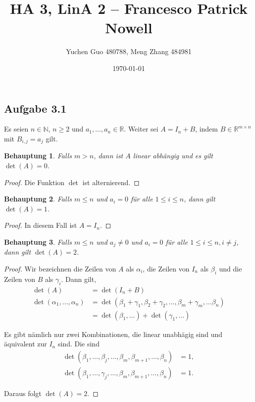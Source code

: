 \documentclass[draft,a5paper]{article}
\author{Yuchen Guo 480788, Meng Zhang 484981}
\date{\today}
\title{HA 3, LinA 2 -- Francesco Patrick Nowell}
\newtheorem*{beh}{Behauptung}
\begin{document}
\maketitle

\newpage

\subsection*{Aufgabe 3.1}

Es seien \(n \in \mathbb{N}\), \(n \ge 2\) und
\(a_{1}, \ldots, a_{n} \in \mathbb{R}\).  Weiter sei
\(A = I_{n} + B\), indem \(B \in \mathbb{R}^{m \times n}\) mit
\(B_{i, j} = a_{j}\) gilt.

\begin{beh}
  Falls \(m > n\), dann ist \(A\) linear abhängig und es gilt \(\det (A)
= 0\).
\end{beh}

\begin{proof}
  Die Funktion \(\det\) ist alternierend.
\end{proof}

\begin{beh}
Falls \(m \le n\) und \(a_{i} = 0\) für alle \(1 \le i \le n\), dann gilt
\(\det(A) = 1\).
\end{beh}

\begin{proof}
  In diesem Fall ist \(A = I_{n}\).
\end{proof}

\begin{beh}
Falls \(m \le n\) und \(a_{j} \ne 0\) und \(a_{i} = 0\) für alle \(1 \le i \le
n, i \ne j\), dann gilt
\(\det(A) = 2\).
\end{beh}

\begin{proof}
Wir bezeichnen die Zeilen
von \(A\) als \(\alpha_{i}\), die Zeilen von \(I_{n}\) als
\(\beta_{i}\) und die Zeilen von \(B\) als \(\gamma_{i}\).  Dann gilt,
\begin{align*}
  \det(A)
  &= \det(I_{n} + B) \\
  \det(\alpha_{1}, \ldots, \alpha_{n})
  &= \det(\beta_{1} + \gamma_{1}, \beta_{2} + \gamma_{2}, \ldots, \beta_{m}
    + \gamma_{m}, \ldots \beta_{n}) \\
  &= \det(\beta_{1}, \ldots) + \det(\gamma_{1}, \ldots)
\end{align*}

Es gibt nämlich nur zwei Kombinationen, die linear unabhägig sind und
äquivalent zur \(I_{n}\) sind.  Die sind
\begin{align*}
  \det(\beta_{1}, \ldots, \beta_{j}, \ldots, \beta_{m}, \beta_{m+1}, \ldots, \beta_{n}) &= 1, \\
  \det(\beta_{1}, \ldots, \gamma_{j}, \ldots, \beta_{m}, \beta_{m+1}, \ldots, \beta_{n}) &= 1.
\end{align*}

Daraus folgt \(\det(A) = 2\).
\end{proof}
\end{document}

